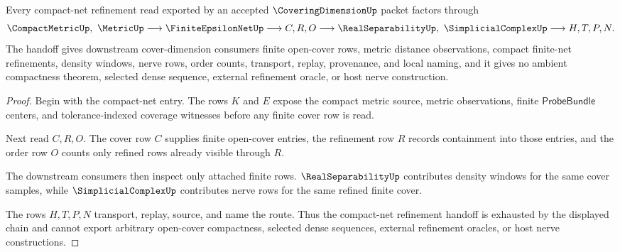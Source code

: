 \begin{theorem}
\label{thm:coveringdimension-compact-net-refinement-handoff}
Every compact-net refinement read exported by an accepted $\CoveringDimensionUp$ packet factors through
$$
\CompactMetricUp,\ \MetricUp
\longrightarrow
\FiniteEpsilonNetUp
\longrightarrow
C,R,O
\longrightarrow
\RealSeparabilityUp,\ \SimplicialComplexUp
\longrightarrow
H,T,P,N .
$$
The handoff gives downstream cover-dimension consumers finite open-cover rows, metric distance observations, compact finite-net refinements, density windows, nerve rows, order counts, transport, replay, provenance, and local naming, and it gives no ambient compactness theorem, selected dense sequence, external refinement oracle, or host nerve construction.
\end{theorem}
\begin{proof}
Begin with the compact-net entry. The rows $K$ and $E$ expose the compact metric source, metric observations, finite $\mathsf{ProbeBundle}$ centers, and tolerance-indexed coverage witnesses before any finite cover row is read.

Next read $C,R,O$. The cover row $C$ supplies finite open-cover entries, the refinement row $R$ records containment into those entries, and the order row $O$ counts only refined rows already visible through $R$.

The downstream consumers then inspect only attached finite rows. $\RealSeparabilityUp$ contributes density windows for the same cover samples, while $\SimplicialComplexUp$ contributes nerve rows for the same refined finite cover.

The rows $H,T,P,N$ transport, replay, source, and name the route. Thus the compact-net refinement handoff is exhausted by the displayed chain and cannot export arbitrary open-cover compactness, selected dense sequences, external refinement oracles, or host nerve constructions.
\end{proof}

